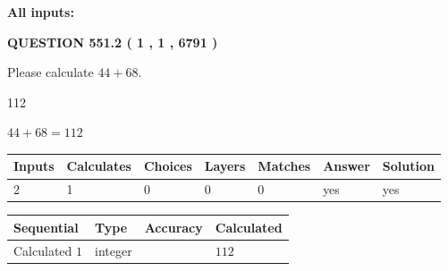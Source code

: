 \documentclass[12pt]{article}
\begin{document}
   
   
   
\noindent\vspace{0.1in}\hspace{-0.08in} {\textbf{\Large{All inputs: }}}
   
   
  
\vspace{0.2in}
  
{\textbf{\Large{QUESTION
551.2 
 ( 1 , 1 , 6791 )
}}}
  
  
 
Please calculate $ %
44 +  %
68 $.
 
 
 
\noindent{}
 
 

112
 
 
\noindent{}
 
 

 
 
 
\noindent{}
 
 

$ %
44 +  %
68=   %
112$
 
 
\noindent{}
 
 

 
   
   
   
   
\noindent\begin{tabular}{|l|l|l|l|l|l|l|}
 \hline
Inputs & Calculates & Choices & Layers & Matches & Answer & Solution \\ \hline
 2  & 
 1  & 
 0
  & 
 0  & 
 0  & 
  yes & 
  yes 
  \\ \hline
 \end{tabular}
   
   
   
   
\noindent{}
   
   
  
  
\noindent\begin{tabular}{|l|l|l|l|}
\hline
 Sequential & Type & Accuracy & Calculated \\ 
\hline
 
 
  Calculated $  1 $ & integer &  & 
  $ 112 $ 
 \\  \hline  
 \end{tabular}
   
\end{document}
